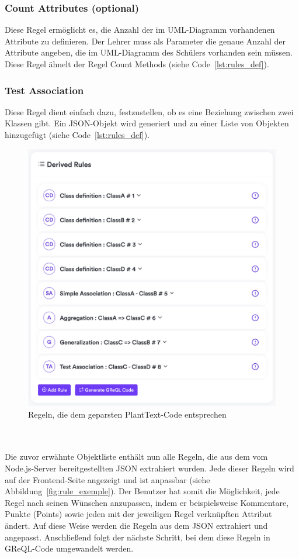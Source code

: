 \subsubsection{Count Attributes (optional)}
Diese Regel ermöglicht es, die Anzahl der im UML-Diagramm vorhandenen Attribute zu definieren. Der Lehrer muss als
Parameter die genaue Anzahl der Attribute angeben, die im UML-Diagramm des Schülers vorhanden sein müssen. Diese Regel
ähnelt der Regel Count Methods (siehe Code~\ref{lst:rules_def}).

\subsubsection{Test Association}
Diese Regel dient einfach dazu, festzustellen, ob es eine Beziehung zwischen zwei Klassen gibt. Ein JSON-Objekt wird
generiert und zu einer Liste von Objekten hinzugefügt (siehe Code~\ref{lst:rules_def}).

\begin{figure}[h!]
    \centering
    \includegraphics[width=16cm]{images/extracted_rules}
    \caption{Regeln, die dem geparsten PlantText-Code entsprechen}
    \label{fig:extracted_rules}
\end{figure}

\\~\\
Die zuvor erwähnte Objektliste enthält nun alle Regeln, die aus dem vom Node.js-Server bereitgestellten JSON extrahiert
wurden. Jede dieser Regeln wird auf der Frontend-Seite angezeigt und ist anpassbar (siehe Abbildung~\ref{fig:rule_exemple}).
Der Benutzer hat somit die Möglichkeit, jede Regel nach seinen Wünschen anzupassen, indem er beispielsweise Kommentare,
Punkte (Points) sowie jeden mit der jeweiligen Regel verknüpften Attribut ändert. Auf diese Weise werden die Regeln aus dem JSON
extrahiert und angepasst. Anschließend folgt der nächste Schritt, bei dem diese Regeln in GReQL-Code umgewandelt werden.


